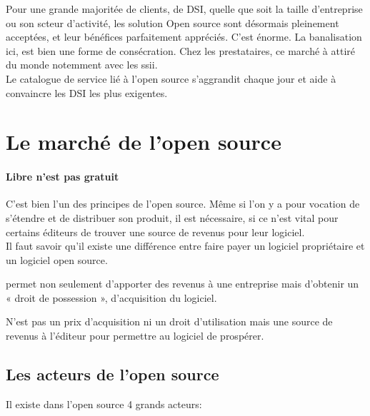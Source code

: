			Pour une grande majoritée de clients, de DSI, quelle que soit la taille d'entreprise ou son scteur d'activité, les solution Open source sont désormais pleinement acceptées, et leur bénéfices parfaitement appréciés. C'est énorme. La banalisation ici, est bien une forme de consécration. Chez les prestataires, ce marché à attiré du monde notemment avec les \acrshort{ssii}.\\

			Le catalogue de service lié à l'open source s'aggrandit chaque jour et aide à convaincre les DSI les plus exigentes.


	\section{Le marché de l'open source} %

		\paragraph{Libre n'est pas gratuit \\} 

			C'est bien l'un des principes de l'open source. Même si l'on y a pour vocation de s'étendre et de distribuer son produit, il est nécessaire, si ce n'est vital pour certains éditeurs de trouver une source de revenus pour leur logiciel.\\
			Il faut savoir qu'il existe une différence entre faire payer un logiciel propriétaire et un logiciel open source. 
			\begin{description}[font=\color{burntorange}]
				\item [Payer un logiciel propriétaire: ] permet non seulement d'apporter des revenus à une entreprise mais d'obtenir un « droit de possession », d'acquisition du logiciel.
				\item [Payer un logiciel open source: ] N'est pas un prix d'acquisition ni un droit d'utilisation mais une source de revenus à l'éditeur pour permettre au logiciel de prospérer.
			\end{description}

		\subsection{Les acteurs de l'open source}
			Il existe dans l'open source 4 grands acteurs:

